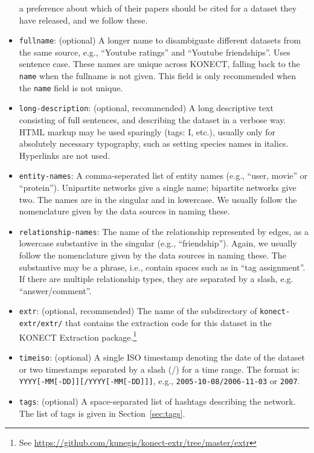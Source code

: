 \documentclass{article}
\begin{document}
\begin{itemize}
  a preference about which of their papers should be cited for a dataset
  they have released, and we follow these. 
\item \texttt{fullname}: (optional) A longer name to disambiguate
  different datasets from the same source, e.g., ``Youtube
  ratings'' and ``Youtube friendships''.  Uses sentence case.  These
  names are unique across KONECT, falling back to the \texttt{name} when
  the fullname is not given.  This field is only recommended when the
  \texttt{name} field is not unique. 
\item \texttt{long-description}: (optional, recommended) A long descriptive
  text consisting of full sentences, and describing the dataset in
  a verbose way.  HTML markup may be used sparingly (tags: I,
  etc.), usually only for absolutely necessary typography, such as
  setting species names in italics.  Hyperlinks are not used. 
\item \texttt{entity-names}: A comma-seperated list of
  entity names (e.g., ``user, movie'' or ``protein'').  Unipartite networks give
  a single name; bipartite networks give two.
  The names are in the singular and in lowercase. 
  We usually follow the nomenclature given by the data sources in naming
  these. 
\item \texttt{relationship-names}: The name of the
  relationship represented by edges, as a lowercase substantive in the singular (e.g.,
  ``friendship'').
  Again, we usually follow the nomenclature given by the data sources in naming
  these.  The substantive may be a phrase, i.e., contain spaces such as
  in ``tag assignment''.  If there are multiple relationship types, they
  are separated by a slash, e.g. ``answer/comment''.
\item \texttt{extr}: (optional, recommended) The name of the
  subdirectory of \texttt{konect-extr/extr/} that
  contains the extraction code for this dataset in the KONECT
  Extraction package.\footnote{See \href{https://github.com/kunegis/konect-extr/tree/master/extr}{https://github.com/kunegis/konect-extr/tree/master/extr}}
\item \texttt{timeiso}: (optional) A single ISO timestamp denoting
  the date of the dataset or two timestamps separated by a
  slash (/) for a time range. The format is:
  \texttt{YYYY[-MM[-DD]][/YYYY[-MM[-DD]]]}, e.g., \texttt{2005-10-08/2006-11-03}
  or \texttt{2007}.
\item \texttt{tags}: (optional) A space-separated list of hashtags
  describing the network.  The list of tags is given in
  Section~\ref{sec:tags}.  

\end{itemize}
\end{document}
